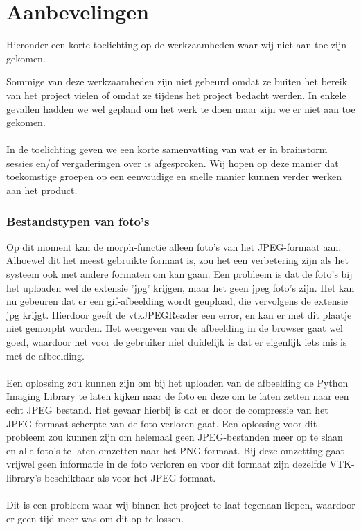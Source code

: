 \chapter{Aanbevelingen} %
\label{Aanbevelingen}
Hieronder een korte toelichting op de werkzaamheden waar wij niet aan toe zijn gekomen. 

Sommige van deze werkzaamheden zijn niet gebeurd omdat ze buiten het bereik van het project vielen of omdat ze tijdens het project bedacht werden. 
In enkele gevallen hadden we wel gepland om het werk te doen maar zijn we er niet aan toe gekomen.  
\\
\\
In de toelichting geven we een korte samenvatting van wat er in brainstorm sessies en/of vergaderingen over is afgesproken. 
Wij hopen op deze manier dat toekomstige groepen op een eenvoudige en snelle manier kunnen verder werken aan het product.

\subsection{Bestandstypen van foto's} %
Op dit moment kan de morph-functie alleen foto's van het JPEG-formaat aan. 
Alhoewel dit het meest gebruikte formaat is, zou het een verbetering zijn als het systeem ook met andere formaten om kan gaan. 
Een probleem is dat de foto's bij het uploaden wel de extensie 'jpg' krijgen, maar het geen jpeg foto's zijn. 
Het kan nu gebeuren dat er een gif-afbeelding wordt geupload, die vervolgens de extensie jpg krijgt. 
Hierdoor geeft de vtkJPEGReader een error, en kan er met dit plaatje niet gemorpht worden. 
Het weergeven van de afbeelding in de browser gaat wel goed, waardoor het voor de gebruiker niet duidelijk is dat er eigenlijk iets mis is met de afbeelding.
\\
\\
Een oplossing zou kunnen zijn om bij het uploaden van de afbeelding de Python Imaging Library te laten kijken naar de foto en deze om te laten zetten naar een echt JPEG bestand. 
Het gevaar hierbij is dat er door de compressie van het JPEG-formaat scherpte van de foto verloren gaat.
Een oplossing voor dit probleem zou kunnen zijn om helemaal geen JPEG-bestanden meer op te slaan en alle foto's te laten omzetten naar het PNG-formaat. Bij deze omzetting gaat vrijwel geen informatie in de foto verloren en voor dit formaat zijn dezelfde VTK-library's beschikbaar als voor het JPEG-formaat.
\\
\\
Dit is een probleem waar wij binnen het project te laat tegenaan liepen, waardoor er geen tijd meer was om dit op te lossen.

